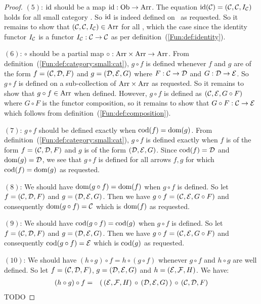\begin{proof}
    $(5)$: $\mbox{\rm id}$ should be a map $\mbox{\rm id}:\mbox{\rm Ob}\to\mbox{\rm Arr}$. The equation $\mbox{\rm id}(\mbox{$\cal C$})
    =(\mbox{$\cal C$},\mbox{$\cal C$},I_{\cal C})$ holds for all small category \Cat. So $\mbox{\rm id}$
    is indeed defined on \ob\ as requested. So it remains to show that
    $(\mbox{$\cal C$},\mbox{$\cal C$},I_{\cal C})\in\mbox{\rm Arr}$ for all \Cat, which the case since
    the identity functor $I_{\cal C}$ is a functor $I_{\cal C}:\mbox{$\cal C$}\to\mbox{$\cal C$}$ as 
    per definition~(\ref{Fun:def:identity}).

    $(6)$: $\circ$ should be a partial map $\circ:\mbox{\rm Arr}\times\mbox{\rm Arr}\to\mbox{\rm Arr}$.
    From definition~(\ref{Fun:def:category:small:cat}), $g\circ f$ is defined
    whenever $f$ and $g$ are of the form $f=(\mbox{$\cal C$},\mbox{$\cal D$},F)$ and $g=(\mbox{$\cal D$},\mbox{$\cal E$},G)$
    where $F:\mbox{$\cal C$}\to\mbox{$\cal D$}$ and $G:\mbox{$\cal D$}\to\mbox{$\cal E$}$. So $g\circ f$ is defined on
    a sub-collection of $\mbox{\rm Arr}\times\mbox{\rm Arr}$ as requested. So it remains to 
    show that $g\circ f\in\mbox{\rm Arr}$ when defined. However, $g\circ f$ is defined
    as $(\mbox{$\cal C$},\mbox{$\cal E$},G \circ F)$ where $G\circ F$ is the functor composition,
    so it remains to show that $G\circ F:\mbox{$\cal C$}\to\mbox{$\cal E$}$ which follows from
    definition~(\ref{Fun:def:composition}).

    $(7)$: $g\circ f$ should be defined exactly when $\mbox{\rm cod}(f)=\mbox{\rm dom}(g)$. From
    definition~(\ref{Fun:def:category:small:cat}), $g\circ f$ is defined 
    exactly when $f$ is of the form $f=(\mbox{$\cal C$},\mbox{$\cal D$},F)$ and $g$ is of the form
    $(\mbox{$\cal D$},\mbox{$\cal E$},G)$. Since $\mbox{\rm cod}(f)=\mbox{$\cal D$}$ and $\mbox{\rm dom}(g)=\mbox{$\cal D$}$, we see that
    $g\circ f$ is defined for all arrows $f,g$ for which $\mbox{\rm cod}(f)=\mbox{\rm dom}(g)$ 
    as requested.

    $(8)$: We should have $\mbox{\rm dom}(g\circ f) = \mbox{\rm dom}(f)$ when $g\circ f$ is defined.
    So let $f=(\mbox{$\cal C$},\mbox{$\cal D$},F)$ and $g=(\mbox{$\cal D$},\mbox{$\cal E$},G)$. Then we have 
    $g\circ f=(\mbox{$\cal C$},\mbox{$\cal E$},G\circ F)$ and consequently $\mbox{\rm dom}(g\circ f)=\mbox{$\cal C$}$ which
    is $\mbox{\rm dom}(f)$ as requested.

    $(9)$: We should have $\mbox{\rm cod}(g\circ f) = \mbox{\rm cod}(g)$ when $g\circ f$ is defined.
    So let $f=(\mbox{$\cal C$},\mbox{$\cal D$},F)$ and $g=(\mbox{$\cal D$},\mbox{$\cal E$},G)$. Then we have 
    $g\circ f=(\mbox{$\cal C$},\mbox{$\cal E$},G\circ F)$ and consequently $\mbox{\rm cod}(g\circ f)=\mbox{$\cal E$}$ which
    is $\mbox{\rm cod}(g)$ as requested.

    $(10)$: We should have $(h\circ g)\circ f = h\circ(g\circ f)$ whenever
    $g\circ f$ and $h\circ g$ are well defined. So let $f=(\mbox{$\cal C$},\mbox{$\cal D$},F)$,
    $g=(\mbox{$\cal D$},\mbox{$\cal E$},G)$ and $h=(\mbox{$\cal E$},{\cal F},H)$. We have:
        \begin{eqnarray*}(h\circ g)\circ f
            &=&(\,(\mbox{$\cal E$},{\cal F},H)\,\circ\,(\mbox{$\cal D$},\mbox{$\cal E$},G)\,)\,
            \circ\,(\mbox{$\cal C$},\mbox{$\cal D$},F)\\
        \end{eqnarray*}
TODO
\end{proof}
